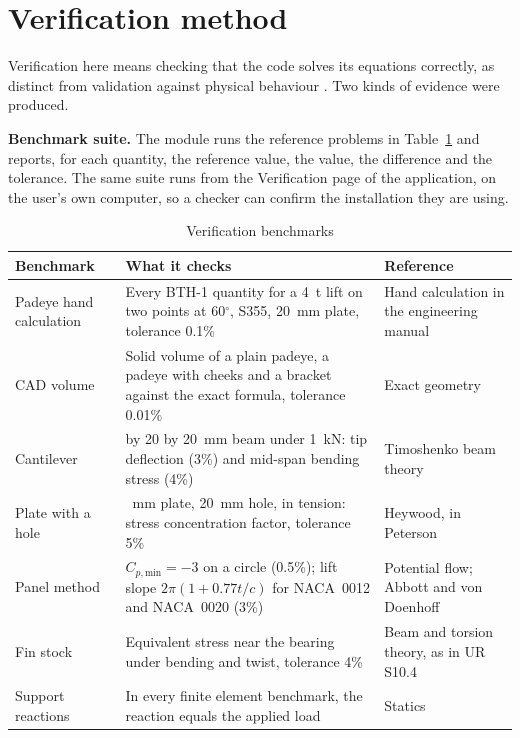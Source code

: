 \section{Verification method}
\label{sec:verification-method}

Verification here means checking that the code solves its equations
correctly, as distinct from validation against physical behaviour
\cite{asmeVV10}. Two kinds of evidence were produced.

\textbf{Benchmark suite.} The module  runs the
reference problems in Table~\ref{tab:benchmarks} and reports, for each
quantity, the reference value, the \NEMO{} value, the difference and the
tolerance. The same suite runs from the Verification page of the application,
on the user's own computer, so a checker can confirm the installation they are
using.

\begin{table}[H]
\centering
\caption{Verification benchmarks}
\label{tab:benchmarks}
\small
\begin{tabularx}{\textwidth}{>{\raggedright\arraybackslash}p{}>{\raggedright\arraybackslash}X>{\raggedright\arraybackslash}p{}}
\toprule
\textbf{Benchmark} & \textbf{What it checks} & \textbf{Reference}\\
\midrule
Padeye hand calculation & Every BTH-1 quantity for a 4~t lift on two points at 60$^\circ$, S355, 20~mm plate, tolerance 0.1\% & Hand calculation in the engineering manual\\
CAD volume & Solid volume of a plain padeye, a padeye with cheeks and a bracket against the exact formula, tolerance 0.01\% & Exact geometry\\
Cantilever & 200 by 20 by 20~mm beam under 1~kN: tip deflection (3\%) and mid-span bending stress (4\%) & Timoshenko beam theory \cite{timoshenko1972}\\
Plate with a hole & 200~mm plate, 20~mm hole, in tension: stress concentration factor, tolerance 5\% & Heywood, in Peterson \cite{peterson2008}\\
Panel method & $C_{p,\text{min}} = -3$ on a circle (0.5\%); lift slope $2\pi(1 + 0.77t/c)$ for NACA~0012 and NACA~0020 (3\%) & Potential flow; Abbott and von Doenhoff \cite{abbott1959}\\
Fin stock & Equivalent stress near the bearing under bending and twist, tolerance 4\% & Beam and torsion theory, as in UR S10.4\\
Support reactions & In every finite element benchmark, the reaction equals the applied load & Statics\\
\bottomrule
\end{tabularx}
\end{table}

